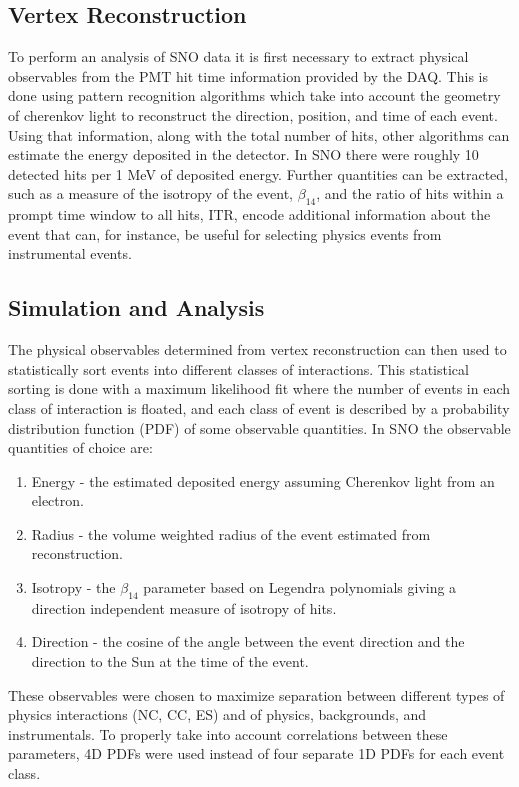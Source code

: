 \subsection{Vertex Reconstruction}

To perform an analysis of SNO data it is first necessary to extract physical observables from the PMT hit time information provided by the DAQ.
This is done using pattern recognition algorithms which take into account the geometry of cherenkov light to reconstruct the direction, position, and time of each event.
Using that information, along with the total number of hits, other algorithms can estimate the energy deposited in the detector. 
In SNO there were roughly 10 detected hits per 1 MeV of deposited energy.
Further quantities can be extracted, such as a measure of the isotropy of the event, $\beta_{14}$, and the ratio of hits within a prompt time window to all hits, ITR, encode additional information about the event that can, for instance, be useful for selecting physics events from instrumental events.

\subsection{Simulation and Analysis}

The physical observables determined from vertex reconstruction can then used to statistically sort events into different classes of interactions.
This statistical sorting is done with a maximum likelihood fit where the number of events in each class of interaction is floated, and each class of event is described by a probability distribution function (PDF) of some observable quantities.
In SNO the observable quantities of choice are:
\begin{enumerate}
    \item Energy - the estimated deposited energy assuming Cherenkov light from an electron.
    \item Radius - the volume weighted radius of the event estimated from reconstruction.
    \item Isotropy - the $\beta_{14}$ parameter based on Legendra polynomials giving a direction independent measure of isotropy of hits.
    \item Direction - the cosine of the angle between the event direction and the direction to the Sun at the time of the event.
\end{enumerate}
These observables were chosen to maximize separation between different types of physics interactions (NC, CC, ES) and of physics, backgrounds, and instrumentals. 
To properly take into account correlations between these parameters, 4D PDFs were used instead of four separate 1D PDFs for each event class.

